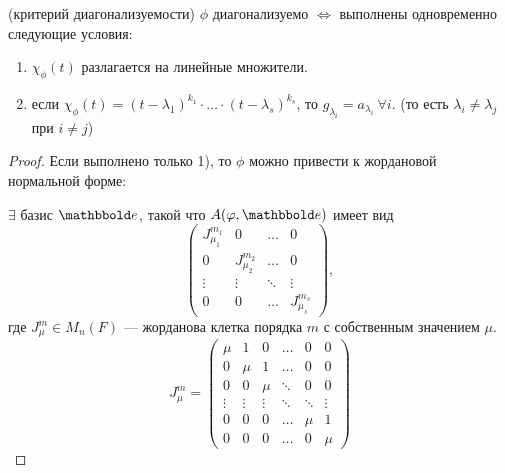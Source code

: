 \begin{theorem}{(критерий диагонализуемости)} $\phi$ диагонализуемо $\iff$ выполнены одновременно следующие условия:

    \begin{enumerate}
        \item $\chi_\phi(t)$ разлагается на линейные множители.
        \item если $\chi_\phi(t) = (t - \lambda_1)^{k_1} \cdot \ldots \cdot (t - \lambda_s)^{k_s}$, то $g_{\lambda_i} = a_{\lambda_i} \ \forall i$. (то есть $\lambda_i \neq \lambda_j$ при $i \neq j$)
    \end{enumerate}
\end{theorem}

\begin{proof}
    Если выполнено только 1), то $\phi$ можно привести к жордановой нормальной форме:

    $\exists$ базис $\E$, такой что $A(\phi, \E)$ имеет вид
    \begin{equation*}
        \begin{pmatrix} 
            J_{\mu_1}^{m_1} & 0 & \dots & 0 \\
            0 & J_{\mu_2}^{m_2} & \dots & 0 \\
            \vdots & \vdots & \ddots & \vdots \\
            0 & 0 & \dots & J_{\mu_s}^{m_s}
        \end{pmatrix}
    ,\end{equation*}
    где $J_{\mu}^m \in M_n(F)$ --- жорданова клетка порядка $m$ с собственным значением $\mu$.
    \begin{equation*}
        J_{\mu}^m = \begin{pmatrix} 
            \mu & 1 & 0 & \dots & 0 & 0 \\
            0 & \mu & 1 & \dots & 0 & 0 \\
            0 & 0 & \mu & \ddots & 0 & 0 \\
            \vdots & \vdots & \vdots & \ddots & \ddots & \vdots \\
            0 & 0 & 0 & \dots & \mu & 1 \\
            0 & 0 & 0 & \dots & 0 & \mu
        \end{pmatrix}
    \end{equation*}
\end{proof}

